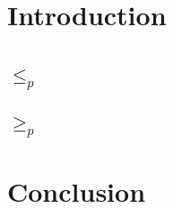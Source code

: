 \section{Introduction}


\section{\Problem{}}

	\subsection{\Prob{} $\leq_p$ \ProbGroup{}}
	
	\subsection{\Prob{} $\geq_p$ \ProbGroup{}}
	

\section{Conclusion}
